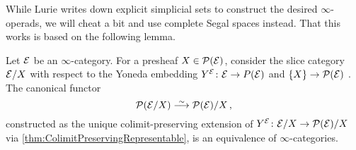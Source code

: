 While Lurie writes down explicit simplicial sets to construct the desired $\infty$-operads, we will cheat a bit and use complete Segal spaces instead. That this works is based on the following lemma.
\begin{lem}\label{lem:TautologicalPresheafLemma}
	Let $\mathcal{E}$ be an $\infty$-category. For a presheaf $X\in \mathcal{P}(\mathcal{E})$, consider the slice category $\mathcal{E}/X$ with respect to the Yoneda embedding $\Yo^\Ee\colon \Ee\morphism P(\Ee)$ and $\{X\}\morphism \Pp(\Ee)$ . The canonical functor
	\begin{equation*}
		\Pp(\Ee/X)\isomorphism \Pp(\Ee)/X\,,
	\end{equation*}
	constructed as the unique colimit-preserving extension of $\Yo^\Ee\colon\Ee/X\morphism \Pp(\Ee)/X$ via \cref{thm:ColimitPreservingRepresentable}, is an equivalence of $\infty$-categories.
\end{lem}
